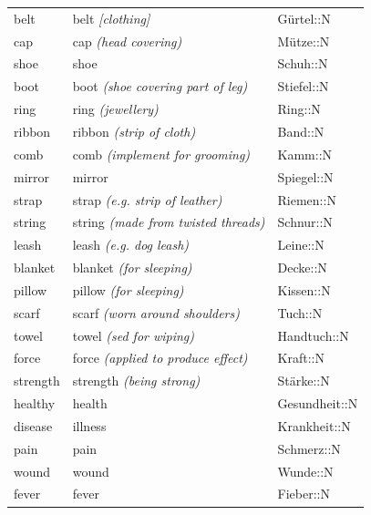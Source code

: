 \begin{center}
\begin{longtable}{lll}
{\sc \lowercase{	BELT	}}	&	belt	\textit{\footnotesize [clothing]}	&	Gürtel::N	\\
{\sc \lowercase{	CAP	}}	&	cap	\textit{\footnotesize (head covering)}	&	Mütze::N	\\
{\sc \lowercase{	SHOE	}}	&	shoe		&	Schuh::N	\\
{\sc \lowercase{	BOOT	}}	&	boot	\textit{\footnotesize (shoe covering part of leg)}	&	Stiefel::N	\\
{\sc \lowercase{	RING	}}	&	ring	\textit{\footnotesize (jewellery)}	&	Ring::N	\\
{\sc \lowercase{	RIBBON	}}	&	ribbon	\textit{\footnotesize (strip of cloth)}	&	Band::N	\\
{\sc \lowercase{	COMB	}}	&	comb	\textit{\footnotesize (implement for grooming)}	&	Kamm::N	\\
{\sc \lowercase{	MIRROR	}}	&	mirror		&	Spiegel::N	\\
{\sc \lowercase{	STRAP	}}	&	strap	\textit{\footnotesize (e.g. strip of leather)}	&	Riemen::N	\\
{\sc \lowercase{	STRING	}}	&	string	\textit{\footnotesize (made from twisted threads)}	&	Schnur::N	\\
{\sc \lowercase{	LEASH	}}	&	leash	\textit{\footnotesize (e.g. dog leash)}	&	Leine::N	\\
{\sc \lowercase{	BLANKET	}}	&	blanket	\textit{\footnotesize (for sleeping)}	&	Decke::N	\\
{\sc \lowercase{	PILLOW	}}	&	pillow	\textit{\footnotesize (for sleeping)}	&	Kissen::N	\\
{\sc \lowercase{	SCARF	}}	&	scarf	\textit{\footnotesize (worn around shoulders)}	&	Tuch::N	\\
{\sc \lowercase{	TOWEL	}}	&	towel	\textit{\footnotesize (sed for wiping)}	&	Handtuch::N	\\
{\sc \lowercase{	FORCE	}}	&	force	\textit{\footnotesize (applied to produce effect)}	&	Kraft::N	\\
{\sc \lowercase{	STRENGTH	}}	&	strength	\textit{\footnotesize (being strong)}	&	Stärke::N	\\
{\sc \lowercase{	HEALTHY	}}	&	health		&	Gesundheit::N	\\
{\sc \lowercase{	DISEASE	}}	&	illness		&	Krankheit::N	\\
{\sc \lowercase{	PAIN	}}	&	pain		&	Schmerz::N	\\
{\sc \lowercase{	WOUND	}}	&	wound		&	Wunde::N	\\
{\sc \lowercase{	FEVER	}}	&	fever		&	Fieber::N	\\

\end{longtable}
\end{center}
